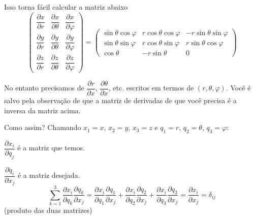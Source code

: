 Isso torna fácil calcular a matriz abaixo
\begin{equation}
    \begin{pmatrix}
        \dfrac{\partial x}{\partial r} & \dfrac{\partial x}{\partial \theta} & \dfrac{\partial x}{\partial \varphi} \\[2mm]
        \dfrac{\partial y}{\partial r} & \dfrac{\partial y}{\partial \theta} & \dfrac{\partial y}{\partial \varphi} \\[2mm]
        \dfrac{\partial z}{\partial r} & \dfrac{\partial z}{\partial \theta} & \dfrac{\partial z}{\partial \varphi}
    \end{pmatrix}
    =
    \begin{pmatrix}
        \sin\theta\cos\varphi & r\cos\theta\cos\varphi & -r\sin\theta\sin\varphi \\
        \sin\theta\sin\varphi & r\cos\theta\sin\varphi & r\sin\theta\cos\varphi \\
        \cos\theta & -r\sin\theta & 0
    \end{pmatrix}
\label{eq:aula19_matriz_jacobiana_direta}
\end{equation}

No entanto precisamos de $\dfrac{\partial r}{\partial x}$, $\dfrac{\partial \theta}{\partial x}$, etc. escritos em termos de $(r,\theta,\varphi)$. Você é salvo pela observação de que a matriz de derivadas de que você precisa é a inversa da matriz acima.

Como assim? Chamando $x_1 = x$, $x_2 = y$, $x_3 = z$ e $q_1 = r$, $q_2 = \theta$, $q_3 = \varphi$:

$\dfrac{\partial x_i}{\partial q_j}$ é a matriz que temos.

$\dfrac{\partial q_i}{\partial x_j}$ é a matriz desejada.
\begin{equation}
    \sum_{k=1}^{3} \frac{\partial x_i}{\partial q_k}\frac{\partial q_k}{\partial x_j}
    = \frac{\partial x_i}{\partial q_1}\frac{\partial q_1}{\partial x_j} + \frac{\partial x_i}{\partial q_2}\frac{\partial q_2}{\partial x_j} + \frac{\partial x_i}{\partial q_3}\frac{\partial q_3}{\partial x_j}
    = \frac{\partial x_i}{\partial x_j} = \delta_{ij}
\label{eq:aula19_produto_matrizes}
\end{equation}
(produto das duas matrizes)

